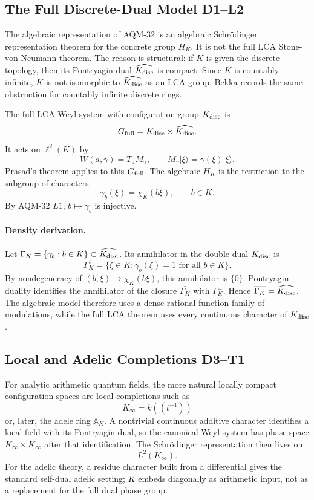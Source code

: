 \subsection{The Full Discrete-Dual Model D1--L2}

The algebraic representation of AQM-32 is an algebraic Schrödinger
representation theorem for the concrete group \(H_K\).  It is not the full LCA
Stone-von Neumann theorem.  The reason is structural: if \(K\) is given the
discrete topology, then its Pontryagin dual \(\widehat{K_{\rm disc}}\) is
compact.  Since \(K\) is countably infinite, \(K\) is not isomorphic to
\(\widehat{K_{\rm disc}}\) as an LCA group.  Bekka records the same obstruction
for countably infinite discrete rings.

The full LCA Weyl system with configuration group \(K_{\rm disc}\) is
\[
  G_{\rm full}=K_{\rm disc}\times\widehat{K_{\rm disc}}.
\]
It acts on \(\ell^2(K)\) by
\[
  W(a,\gamma)=T_aM_\gamma,\qquad
  M_\gamma|\xi\rangle=\gamma(\xi)|\xi\rangle.
\]
Prasad's theorem applies to this \(G_{\rm full}\).  The algebraic \(H_K\) is
the restriction to the subgroup of characters
\[
  \gamma_b(\xi)=\chi_K(b\xi),\qquad b\in K.
\]
By AQM-32 \(L1\), \(b\mapsto\gamma_b\) is injective.

\paragraph{Density derivation.}
Let \(\Gamma_K=\{\gamma_b:b\in K\}\subset\widehat{K_{\rm disc}}\).  Its
annihilator in the double dual \(K_{\rm disc}\) is
\[
  \Gamma_K^\perp
  =
  \{\xi\in K:\gamma_b(\xi)=1\text{ for all }b\in K\}.
\]
By nondegeneracy of \((b,\xi)\mapsto\chi_K(b\xi)\), this annihilator is
\(\{0\}\).  Pontryagin duality identifies the annihilator of the closure
\(\overline{\Gamma_K}\) with \(\Gamma_K^\perp\).  Hence
\(\overline{\Gamma_K}=\widehat{K_{\rm disc}}\).  The algebraic model therefore
uses a dense rational-function family of modulations, while the full LCA
theorem uses every continuous character of \(K_{\rm disc}\).

\subsection{Local and Adelic Completions D3--T1}

For analytic arithmetic quantum fields, the more natural locally compact
configuration spaces are local completions such as
\[
  K_\infty=k((t^{-1}))
\]
or, later, the adele ring \(\mathbb A_K\).  A nontrivial continuous additive
character identifies a local field with its Pontryagin dual, so the canonical
Weyl system has phase space \(K_\infty\times K_\infty\) after that
identification.  The Schrödinger representation then lives on
\[
  L^2(K_\infty).
\]
For the adelic theory, a residue character built from a differential gives the
standard self-dual adelic setting; \(K\) embeds diagonally as arithmetic input,
not as a replacement for the full dual phase group.


